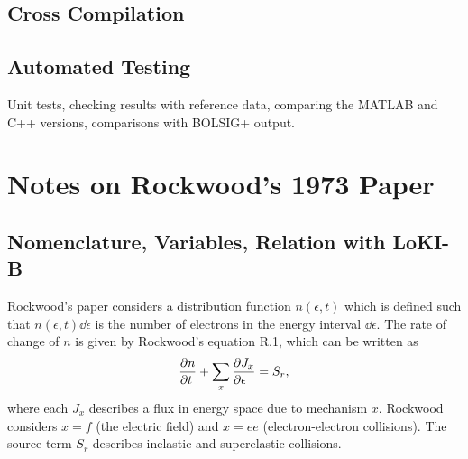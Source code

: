 \documentclass{book}
\begin{document}
\section{Cross Compilation}

\section{Automated Testing}

Unit tests, checking results with reference data, comparing the MATLAB and C++
versions, comparisons with BOLSIG+ output.

\appendix

\chapter{Notes on Rockwood's 1973 Paper}

\label{ch:Rockwood1973Notes}

\section{Nomenclature, Variables, Relation with LoKI-B}

Rockwood's paper \cite{Rockwood1973} considers a distribution function $n(\epsilon,t)$ which
is defined such that $n(\epsilon,t)\dd{\epsilon}$ is the number of electrons in the energy
interval $\dd{\epsilon}$.
The rate of change of $n$ is given by Rockwood's equation R.1, which can be written as
\begin{equation}
	\PDEV{n}{t} +\sum_x\PDEV{J_x}{\epsilon} = S_r,
	\label{eq:rockwood:dn/dt}
\end{equation}
where each $J_x$ describes a flux in energy space due to mechanism $x$. Rockwood
considers $x=f$ (the electric field) and $x=ee$ (electron-electron collisions).
The source term $S_r$ describes inelastic and superelastic collisions.
\end{document}

